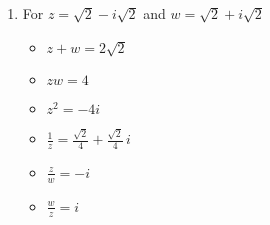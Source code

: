 \begin{enumerate}
\begin{multicols}{3}
\begin{itemize}
\item $\frac{w}{z} = -\frac{9}{13} - \frac{7}{13} \,i$

\end{itemize}

\end{multicols}

\begin{multicols}{3}

\begin{itemize}

\item $\overline{z} = -5-i$

\item $z\overline{z} = 26$

\item $(\overline{z})^2 = 24+10i$

\end{itemize}

\end{multicols}


\item  For  $z = \sqrt{2} - i\sqrt{2}$ and $w = \sqrt{2} + i\sqrt{2}$

\begin{multicols}{3}

\begin{itemize}

\item $z+w = 2\sqrt{2}$

\item $zw = 4$

\item $z^2 = -4i$

\end{itemize}

\end{multicols}

\begin{multicols}{3}

\begin{itemize}

\item $\frac{1}{z} = \frac{\sqrt{2}}{4} + \frac{\sqrt{2}}{4} \,i$

\item $\frac{z}{w} = -i$

\item $\frac{w}{z} = i$

\end{itemize}

\end{multicols}


\end{enumerate}
